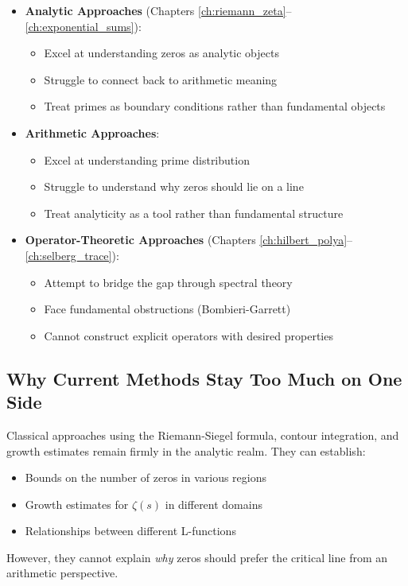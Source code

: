 \begin{itemize}
\item \textbf{Analytic Approaches} (Chapters \ref{ch:riemann_zeta}--\ref{ch:exponential_sums}):
  \begin{itemize}
  \item Excel at understanding zeros as analytic objects
  \item Struggle to connect back to arithmetic meaning
  \item Treat primes as boundary conditions rather than fundamental objects
  \end{itemize}

\item \textbf{Arithmetic Approaches}:
  \begin{itemize}
  \item Excel at understanding prime distribution
  \item Struggle to understand why zeros should lie on a line
  \item Treat analyticity as a tool rather than fundamental structure
  \end{itemize}

\item \textbf{Operator-Theoretic Approaches} (Chapters \ref{ch:hilbert_polya}--\ref{ch:selberg_trace}):
  \begin{itemize}
  \item Attempt to bridge the gap through spectral theory
  \item Face fundamental obstructions (Bombieri-Garrett)
  \item Cannot construct explicit operators with desired properties
  \end{itemize}
\end{itemize}

\subsection{Why Current Methods Stay Too Much on One Side}
\label{subsec:one_sided_methods}

\begin{example}
Classical approaches using the Riemann-Siegel formula, contour integration, and growth estimates remain firmly in the analytic realm. They can establish:
\begin{itemize}
\item Bounds on the number of zeros in various regions
\item Growth estimates for $\zeta(s)$ in different domains
\item Relationships between different L-functions
\end{itemize}
However, they cannot explain \emph{why} zeros should prefer the critical line from an arithmetic perspective.
\end{example}

